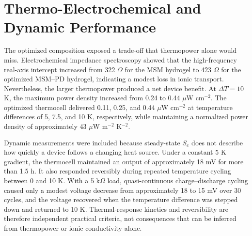 \section{Thermo-Electrochemical and Dynamic Performance}

The optimized composition exposed a trade-off that thermopower alone would
miss. Electrochemical impedance spectroscopy showed that the high-frequency
real-axis intercept increased from 322 $\Omega$ for the MSM hydrogel to
423 $\Omega$ for the optimized MSM--PD hydrogel, indicating a modest loss in
ionic transport. Nevertheless, the larger thermopower produced a net device
benefit. At $\Delta T=10$ K, the maximum power density increased from
0.24 to 0.44 $\mu$W cm$^{-2}$. The optimized thermocell delivered
0.11, 0.25, and 0.44 $\mu$W cm$^{-2}$ at temperature differences of
5, 7.5, and 10 K, respectively, while maintaining a normalized power density
of approximately 43 $\mu$W m$^{-2}$ K$^{-2}$.

Dynamic measurements were included because steady-state $S_e$ does not
describe how quickly a device follows a changing heat source. Under a constant
5 K gradient, the thermocell maintained an output of approximately 18 mV for
more than 1.5 h. It also responded reversibly during repeated temperature
cycling between 0 and 10 K. With a 5 k$\Omega$ load, quasi-continuous
charge--discharge cycling caused only a modest voltage decrease from
approximately 18 to 15 mV over 30 cycles, and the voltage recovered when the
temperature difference was stepped down and returned to 10 K. Thermal-response
kinetics and reversibility are therefore independent practical criteria, not
consequences that can be inferred from thermopower or ionic conductivity alone.

